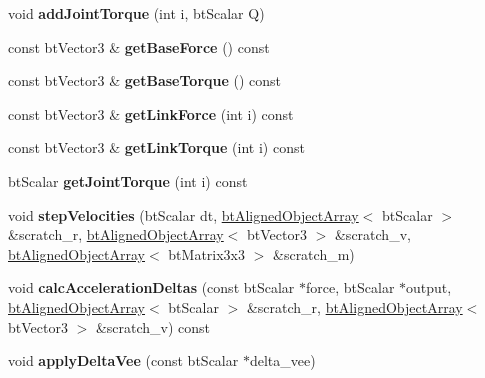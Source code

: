 \begin{DoxyCompactItemize}
void {\bfseries add\+Joint\+Torque} (int i, bt\+Scalar Q)
\item 
\mbox{\label{classbtMultiBody_a9f18e807db3bd459bbbb5cf120302653}} 
const bt\+Vector3 \& {\bfseries get\+Base\+Force} () const
\item 
\mbox{\label{classbtMultiBody_accd9836cb0693648aedb407dc4c824ff}} 
const bt\+Vector3 \& {\bfseries get\+Base\+Torque} () const
\item 
\mbox{\label{classbtMultiBody_ad747f572700fd19e7adf3aedfe2f62da}} 
const bt\+Vector3 \& {\bfseries get\+Link\+Force} (int i) const
\item 
\mbox{\label{classbtMultiBody_a39c8e8401a29ec4a48ce38d78e3a09ad}} 
const bt\+Vector3 \& {\bfseries get\+Link\+Torque} (int i) const
\item 
\mbox{\label{classbtMultiBody_a9593430d6a1286f79cc7394c4aad98bf}} 
bt\+Scalar {\bfseries get\+Joint\+Torque} (int i) const
\item 
\mbox{\label{classbtMultiBody_a19f334bbde8909b282cd55bc28d75b4b}} 
void {\bfseries step\+Velocities} (bt\+Scalar dt, \hyperlink{classbtAlignedObjectArray}{bt\+Aligned\+Object\+Array}$<$ bt\+Scalar $>$ \&scratch\+\_\+r, \hyperlink{classbtAlignedObjectArray}{bt\+Aligned\+Object\+Array}$<$ bt\+Vector3 $>$ \&scratch\+\_\+v, \hyperlink{classbtAlignedObjectArray}{bt\+Aligned\+Object\+Array}$<$ bt\+Matrix3x3 $>$ \&scratch\+\_\+m)
\item 
\mbox{\label{classbtMultiBody_acdd6b296f59bcd747c614a58c616bdf0}} 
void {\bfseries calc\+Acceleration\+Deltas} (const bt\+Scalar $\ast$force, bt\+Scalar $\ast$output, \hyperlink{classbtAlignedObjectArray}{bt\+Aligned\+Object\+Array}$<$ bt\+Scalar $>$ \&scratch\+\_\+r, \hyperlink{classbtAlignedObjectArray}{bt\+Aligned\+Object\+Array}$<$ bt\+Vector3 $>$ \&scratch\+\_\+v) const
\item 
\mbox{\label{classbtMultiBody_ad233408cb61f257b1c3977bf3b7bcd8e}} 
void {\bfseries apply\+Delta\+Vee} (const bt\+Scalar $\ast$delta\+\_\+vee)
\item 
\mbox{\label{classbtMultiBody_aac7bf81725ac6ca493b03d264d06e663}} 

\end{DoxyCompactItemize}
